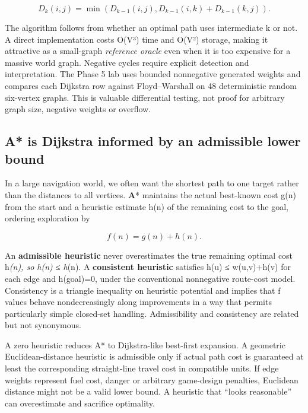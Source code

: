 \[
D_k(i,j)=\min\!\left(D_{k-1}(i,j),
D_{k-1}(i,k)+D_{k-1}(k,j)\right).
\]

The algorithm follows from whether an optimal path uses intermediate k or not. A direct implementation costs O(V³) time and O(V²) storage, making it attractive as a small-graph \emph{reference oracle} even when it is too expensive for a massive world graph. Negative cycles require explicit detection and interpretation. The Phase 5 lab uses bounded nonnegative generated weights and compares each Dijkstra row against Floyd--Warshall on 48 deterministic random six-vertex graphs. This is valuable differential testing, not proof for arbitrary graph size, negative weights or overflow.

\subsection{A* is Dijkstra informed by an admissible lower bound}\label{05-engine-i-ch008-a-is-dijkstra-informed-by-an-admissible-lower-bound}

\hypertarget{05-engine-i-ch008-a-is-dijkstra-informed-by-an-admissible-lower-bound}{}

In a large navigation world, we often want the shortest path to one target rather than the distances to all vertices. \textbf{A}* maintains the actual best-known cost g(n) from the start and a heuristic estimate h(n) of the remaining cost to the goal, ordering exploration by

\[
f(n)=g(n)+h(n).
\]

An \textbf{admissible heuristic} never overestimates the true remaining optimal cost h\emph{(n), so h(n) ≤ h}(n). A \textbf{consistent heuristic} satisfies h(u) ≤ w(u,v)+h(v) for each edge and h(goal)=0, under the conventional nonnegative route-cost model. Consistency is a triangle inequality on heuristic potential and implies that f values behave nondecreasingly along improvements in a way that permits particularly simple closed-set handling. Admissibility and consistency are related but not synonymous.

A zero heuristic reduces A* to Dijkstra-like best-first expansion. A geometric Euclidean-distance heuristic is admissible only if actual path cost is guaranteed at least the corresponding straight-line travel cost in compatible units. If edge weights represent fuel cost, danger or arbitrary game-design penalties, Euclidean distance might not be a valid lower bound. A heuristic that ``looks reasonable'' can overestimate and sacrifice optimality.

